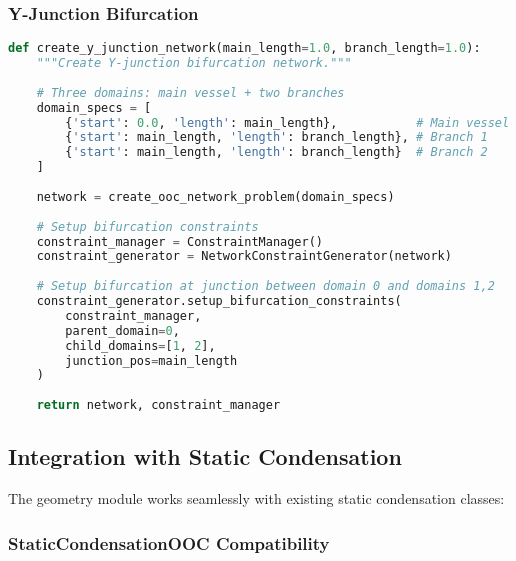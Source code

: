 \subsubsection{Y-Junction Bifurcation}

\begin{lstlisting}[language=Python, caption=Y-Junction Network]
def create_y_junction_network(main_length=1.0, branch_length=1.0):
    """Create Y-junction bifurcation network."""
    
    # Three domains: main vessel + two branches
    domain_specs = [
        {'start': 0.0, 'length': main_length},           # Main vessel
        {'start': main_length, 'length': branch_length}, # Branch 1  
        {'start': main_length, 'length': branch_length}  # Branch 2
    ]
    
    network = create_ooc_network_problem(domain_specs)
    
    # Setup bifurcation constraints
    constraint_manager = ConstraintManager()
    constraint_generator = NetworkConstraintGenerator(network)
    
    # Setup bifurcation at junction between domain 0 and domains 1,2
    constraint_generator.setup_bifurcation_constraints(
        constraint_manager,
        parent_domain=0,
        child_domains=[1, 2], 
        junction_pos=main_length
    )
    
    return network, constraint_manager
\end{lstlisting}

\subsection{Integration with Static Condensation}
\label{subsec:static_condensation_integration}

The geometry module works seamlessly with existing static condensation classes:

\subsubsection{StaticCondensationOOC Compatibility}

